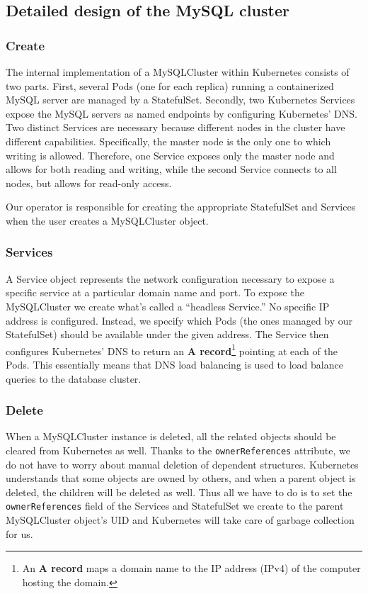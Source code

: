 \subsection{Detailed design of the MySQL cluster}

\subsubsection*{Create}
The internal implementation of a MySQLCluster within Kubernetes consists of two parts. First,
several Pods (one for each replica) running a containerized MySQL server are managed by a
StatefulSet. Secondly, two Kubernetes Services expose the MySQL servers as named endpoints by
configuring Kubernetes’ DNS. Two distinct Services are necessary because different nodes in the
cluster have different capabilities. Specifically, the master node is the only one to which writing
is allowed. Therefore, one Service exposes only the  master node and allows for both reading and
writing, while the second Service connects to all nodes, but allows for read-only access.

Our operator is responsible for creating the appropriate StatefulSet and Services when the user
creates a MySQLCluster object.

\subsubsection*{Services}
A Service object represents the network configuration necessary to expose a specific service at a
particular domain name and port. To expose the MySQLCluster we create what’s called a
“headless Service.” No specific IP address is configured. Instead, we specify which Pods (the ones
managed by our StatefulSet) should be available under the given address. The Service then configures
Kubernetes’ DNS to return an \textbf{A record}\footnote{An \textbf{A record} maps a domain name to
the IP address (IPv4) of the computer hosting the domain.} pointing at each of the Pods. This
essentially means that DNS load balancing is used to load balance queries to the database cluster.

\subsubsection*{Delete}
When a MySQLCluster instance is deleted, all the related objects should be cleared from Kubernetes
as well. Thanks to the \texttt{ownerReferences} attribute, we do not have to worry about manual
deletion of dependent structures. Kubernetes understands that some objects are owned by others, and
when a parent object is deleted, the children will be deleted as well. Thus all we have to do is to set
the \texttt{ownerReferences} field of the Services and StatefulSet we create to the parent
MySQLCluster object’s UID and Kubernetes will take care of garbage collection for us.

